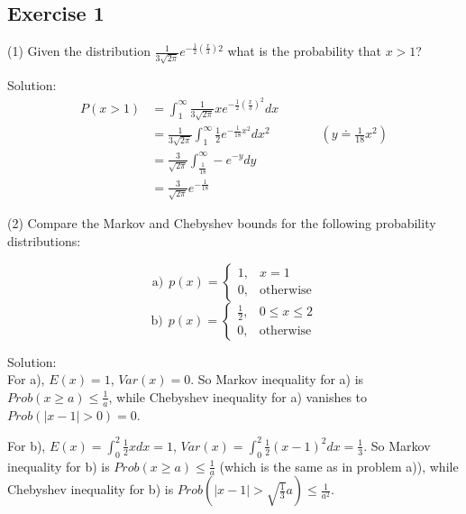 \begin{sloppypar}
\subsection{Exercise 1}
(1) Given the distribution $\frac{1}{3\sqrt{2\pi}}e^{-\frac{1}{2}(\frac{x}{3})2}$ what is the probability that $x>1$?\par
Solution: 
\begin{align}
    \nonumber
    P(x>1)  &= \int_1^{\infty}\frac{1}{3\sqrt{2\pi}}xe^{-\frac{1}{2}(\frac{x}{3})^2}dx\\
    \nonumber
    &=\frac{1}{3\sqrt{2\pi}}\int_1^{\infty}\frac{1}{2}e^{-\frac{1}{18}x^2}dx^2~~~~~~~~~~~~~~~~~~(y\doteq \frac{1}{18}x^2)\\
    \nonumber
    &=\frac{3}{\sqrt{2\pi}}\int_{\frac{1}{18}}^{\infty}-e^{-y}dy\\
    \nonumber
    &=\frac{3}{\sqrt{2\pi}}e^{-\frac{1}{18}}
\end{align}

(2) Compare the Markov and Chebyshev bounds for the following probability distributions:\par

\begin{equation}
    \text{a})~~p(x)=\left\{
    \begin{array}{rl}
        1, & x=1\\
        0, & \text{otherwise}
    \end{array}\right.
\end{equation}
\begin{equation}
    \text{b})~~p(x)=\left\{
    \begin{array}{rl}
        \frac{1}{2}, & 0\leq x\leq 2\\
        0, & \text{otherwise}
    \end{array}\right.
\end{equation}

Solution:\\
For a), $E(x)=1$, $Var(x)=0$. So Markov inequality for a) is $Prob(x\geq a)\leq \frac{1}{a}$, while Chebyshev inequality for a) vanishes to $Prob(|x-1|>0)=0$.\par
For b), $E(x)=\int_0^2 \frac{1}{2}xdx=1$, $Var(x)=\int_0^2 \frac{1}{2}(x-1)^2dx=\frac{1}{3}$. So Markov inequality for b) is $Prob(x\geq a)\leq \frac{1}{a}$ (which is the same as in problem a)), while Chebyshev inequality for b) is $Prob(|x-1|>\sqrt{\frac{1}{3}}a)\leq \frac{1}{a^2}$.\par



\end{sloppypar}
